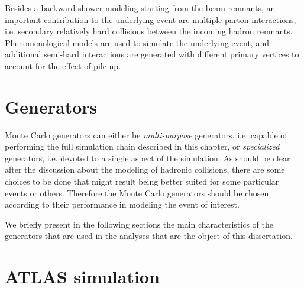 Besides a backward shower modeling starting from the beam remnants, an
important contribution to the underlying event are multiple parton interactions,
i.e. secondary relatively hard collisions between the incoming hadron remnants.
Phenomenological models are used to simulate the underlying event, and additional
semi-hard interactions are generated with different primary vertices to account
for the effect of pile-up.


\section{Generators}\label{sec:generators}

Monte Carlo generators can either be {\it multi-purpose} generators,
i.e. capable of performing the full simulation chain described in this chapter,
or {\it specialized} generators, i.e. devoted to a single aspect of the
simulation. As should be clear after the discussion about the modeling
of hadronic collisions, there are some choices to be done that might result
being better suited for some particular events or others. Therefore
the Monte Carlo generators should be chosen according to their performance
in modeling the event of interest.

We briefly present in the following sections the main characteristics of the generators
that are used in the analyses that are the object of this dissertation.






\section{ATLAS simulation}\label{sec:MCdetector}
